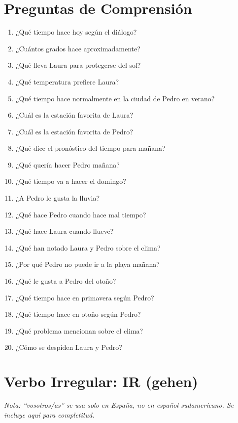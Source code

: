 \documentclass[12pt,a4paper]{article}
\begin{document}
\newpage

\section*{Preguntas de Comprensión}

\begin{enumerate}[leftmargin=*]
    \item ¿Qué tiempo hace hoy según el diálogo?
    \item ¿Cuántos grados hace aproximadamente?
    \item ¿Qué lleva Laura para protegerse del sol?
    \item ¿Qué temperatura prefiere Laura?
    \item ¿Qué tiempo hace normalmente en la ciudad de Pedro en verano?
    \item ¿Cuál es la estación favorita de Laura?
    \item ¿Cuál es la estación favorita de Pedro?
    \item ¿Qué dice el pronóstico del tiempo para mañana?
    \item ¿Qué quería hacer Pedro mañana?
    \item ¿Qué tiempo va a hacer el domingo?
    \item ¿A Pedro le gusta la lluvia?
    \item ¿Qué hace Pedro cuando hace mal tiempo?
    \item ¿Qué hace Laura cuando llueve?
    \item ¿Qué han notado Laura y Pedro sobre el clima?
    \item ¿Por qué Pedro no puede ir a la playa mañana?
    \item ¿Qué le gusta a Pedro del otoño?
    \item ¿Qué tiempo hace en primavera según Pedro?
    \item ¿Qué tiempo hace en otoño según Pedro?
    \item ¿Qué problema mencionan sobre el clima?
    \item ¿Cómo se despiden Laura y Pedro?
\end{enumerate}

\newpage

\section*{Verbo Irregular: IR (gehen)}

\textit{Nota: \enquote{vosotros/as} se usa solo en España, no en español sudamericano. Se incluye aquí para completitud.}
\end{document}
